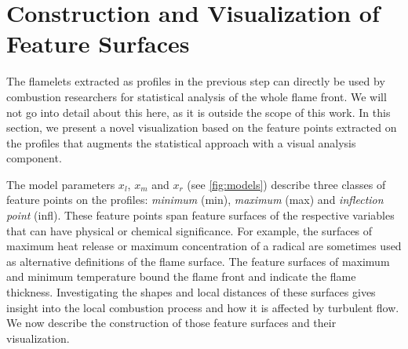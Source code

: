 \section{Construction and Visualization of Feature Surfaces}
\label{sec:visualization}
%
The flamelets extracted as profiles in the previous step can directly be used
by combustion researchers for statistical analysis of the whole flame front.
%
We will not go into detail about this here, as it is outside the scope of this
work.
%
In this section, we present a novel visualization based on the feature points
extracted on the profiles that augments the statistical approach with a visual
analysis component.
%

%
The model parameters $x_l$, $x_m$ and $x_r$ (see \cref{fig:models}) describe
three classes of feature points on the profiles: \emph{minimum} (min),
\emph{maximum} (max) and \emph{inflection point} (infl).
%
% 
These feature points span feature surfaces of the respective variables that can
have physical or chemical significance.
%
For example, the surfaces of maximum heat release or maximum concentration of a
radical are sometimes used as alternative definitions of the flame surface.
%
The feature surfaces of maximum and minimum temperature bound the flame front
and indicate the flame thickness.
%
Investigating the shapes and local distances of these surfaces gives insight
into the local combustion process and how it is affected by turbulent flow.
%
We now describe the construction of those feature surfaces and their
visualization.
%
%
%
%
